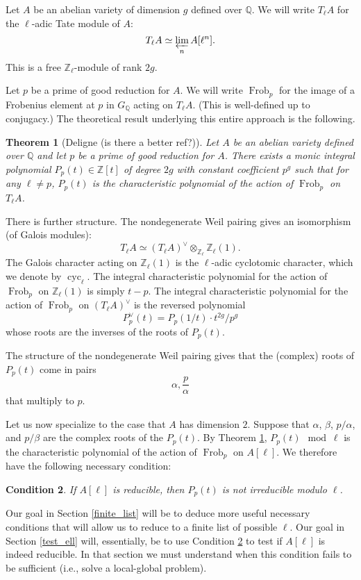 \documentclass[11pt]{amsart}
\newcommand{\qq}{\mathbb{Q}}
\newcommand{\zz}{\mathbb{Z}}
\newcommand{\Frob}{\operatorname{Frob}}
\newcommand{\cyc}{\operatorname{cyc}}
\newtheorem{thm}{Theorem}[section]
\newtheorem{cond}[thm]{Condition}
\newcommand{\defi}[1]{\textsf{#1}}
\theoremstyle{definition}
\theoremstyle{remark}
\begin{document}
Let $A$ be an abelian variety of dimension $g$ defined over $\qq$.
We will write $T_\ell A$ for the $\ell$-adic Tate module of $A$:
\[T_\ell A \simeq \varprojlim_n A[\ell^n].\]
This is a free $\zz_\ell$-module of rank $2g$.


Let $p$ be a prime of good reduction for $A$.  We will write $\Frob_p$ for the image of a Frobenius element at $p$ in $G_\qq$ acting on $T_\ell A$.  (This is well-defined up to conjugacy.)  The theoretical result underlying this entire approach is the following.

\begin{thm}[Deligne (is there a better ref?)]\label{integrality}
Let $A$ be an abelian variety defined over $\qq$ and let $p$ be a prime of good reduction for $A$.  There exists a monic integral polynomial $P_p(t) \in \zz[t]$ of degree $2g$ with constant coefficient $p^g$ such that for any $\ell \neq p$, $P_p(t)$ is the characteristic polynomial of the action of $\Frob_p$ on $T_\ell A$.
\end{thm}

There is further structure.  The nondegenerate Weil pairing gives an isomorphism (of Galois modules):
\[T_\ell A \simeq \left(T_\ell A\right)^\vee \otimes_{\zz_\ell} \zz_\ell(1).\]
The Galois character acting on $\zz_\ell(1)$ is the \defi{$\ell$-adic cyclotomic character}, which we denote by $\cyc_\ell$.  
The integral characteristic polynomial for the action of $\Frob_p$ on $\zz_\ell(1)$ is simply $t-p$.  The integral characteristic polynomial for the action of $\Frob_p$ on $\left(T_\ell A\right)^\vee$ is the reversed polynomial
\[P^\vee_p(t) = P_p(1/t)\cdot t^{2g}/p^g \]
whose roots are the inverses of the roots of $P_p(t)$.

The structure of the nondegenerate Weil pairing gives that the (complex) roots of $P_p(t)$ come in pairs
\[\alpha, \frac{p}{\alpha} \]
that multiply to $p$.

Let us now specialize to the case that $A$ has dimension $2$.
Suppose that $\alpha$, $\beta$, $p/\alpha$, and $p/\beta$ are the complex roots of the $P_p(t)$.  By Theorem \ref{integrality}, $P_p(t) \mod{\ell}$ is the characteristic polynomial of the action of $\Frob_p$ on $A[\ell]$.  We therefore have the following necessary condition:

\begin{cond}\label{easy_necessary}
If $A[\ell]$ is reducible, then $P_p(t)$ is not irreducible modulo $\ell$.
\end{cond}

Our goal in Section \ref{finite_list} will be to deduce more useful necessary conditions that will allow us to reduce to a finite list of possible $\ell$.  Our goal in Section \ref{test_ell} will, essentially, be to use Condition \ref{easy_necessary} to test if $A[\ell]$ is indeed reducible.  In that section we must understand when this condition fails to be sufficient (i.e., solve a local-global problem).
\end{document}

